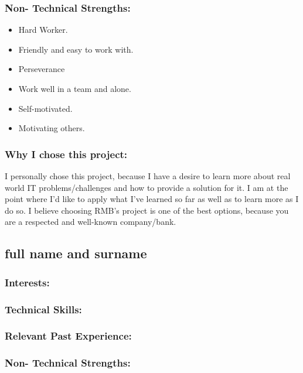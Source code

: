 \subsubsection{Non- Technical Strengths:}
	\begin{itemize}
		\item Hard Worker.
		\item Friendly and easy to work with.
		\item Perseverance
		\item Work well in a team and alone.
		\item Self-motivated.
		\item Motivating others.
	\end{itemize}

\subsubsection{Why I chose this project:}
	\par{I personally chose this project, because I have a desire to learn more about real world IT problems/challenges and how to provide a solution for it. I am at the point where I'd like to apply what I've learned so far as well as to learn more as I do so. I believe choosing RMB's project is one of the best options, because you are a respected and well-known company/bank.}

\newpage
\subsection{full name and surname}

\subsubsection{Interests:}

\subsubsection{Technical Skills:}

\subsubsection{Relevant Past Experience:}

\subsubsection{Non- Technical Strengths:}

